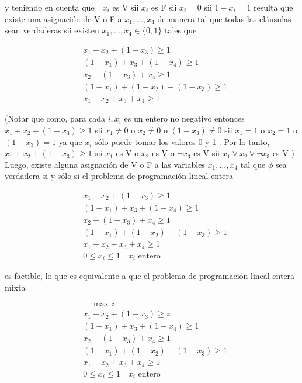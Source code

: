 \documentclass[10pt]{article}
\begin{document}
y teniendo en cuenta que $\neg x_{i}$ es V sii $x_{i}$ es F sii $x_{i}=0$ sii $1-x_{i}=1$ resulta que existe una asignación de V o F a $x_{1}, \ldots, x_{4}$ de manera tal que todas las cláusulas sean verdaderas sii existen $x_{1}, \ldots, x_{4} \in\{0,1\}$ tales que

$$
\begin{aligned}
& x_{1}+x_{2}+\left(1-x_{3}\right) \geq 1 \\
& \left(1-x_{1}\right)+x_{3}+\left(1-x_{4}\right) \geq 1 \\
& x_{2}+\left(1-x_{3}\right)+x_{4} \geq 1 \\
& \left(1-x_{1}\right)+\left(1-x_{2}\right)+\left(1-x_{3}\right) \geq 1 \\
& x_{1}+x_{2}+x_{3}+x_{4} \geq 1
\end{aligned}
$$

(Notar que como, para cada $i, x_{i}$ es un entero no negativo entonces $x_{1}+x_{2}+\left(1-x_{3}\right) \geq 1$ sii $x_{1} \neq 0$ o $x_{2} \neq 0$ o $\left(1-x_{3}\right) \neq 0$ sii $x_{1}=1$ o $x_{2}=1$ o $\left(1-x_{3}\right)=1$ ya que $x_{i}$ sólo puede tomar los valores 0 y 1 . Por lo tanto, $x_{1}+x_{2}+\left(1-x_{3}\right) \geq 1$ sii $x_{1}$ es V o $x_{2}$ es V o $\neg x_{3}$ es V sii $x_{1} \vee x_{2} \vee \neg x_{3}$ es V )\\
Luego, existe alguna asignación de V o F a las variables $x_{1}, \ldots, x_{4}$ tal que $\phi$ sea verdadera si y sólo si el problema de programación lineal entera

$$
\begin{aligned}
& x_{1}+x_{2}+\left(1-x_{3}\right) \geq 1 \\
& \left(1-x_{1}\right)+x_{3}+\left(1-x_{4}\right) \geq 1 \\
& x_{2}+\left(1-x_{3}\right)+x_{4} \geq 1 \\
& \left(1-x_{1}\right)+\left(1-x_{2}\right)+\left(1-x_{3}\right) \geq 1 \\
& x_{1}+x_{2}+x_{3}+x_{4} \geq 1 \\
& 0 \leq x_{i} \leq 1 \quad x_{i} \text { entero }
\end{aligned}
$$

es factible, lo que es equivalente a que el problema de programación lineal entera mixta

$$
\begin{aligned}
& \quad \max z \\
& x_{1}+x_{2}+\left(1-x_{3}\right) \geq z \\
& \left(1-x_{1}\right)+x_{3}+\left(1-x_{4}\right) \geq 1 \\
& x_{2}+\left(1-x_{3}\right)+x_{4} \geq 1 \\
& \left(1-x_{1}\right)+\left(1-x_{2}\right)+\left(1-x_{3}\right) \geq 1 \\
& x_{1}+x_{2}+x_{3}+x_{4} \geq 1 \\
& 0 \leq x_{i} \leq 1 \quad x_{i} \text { entero }
\end{aligned}
$$
\end{document}
